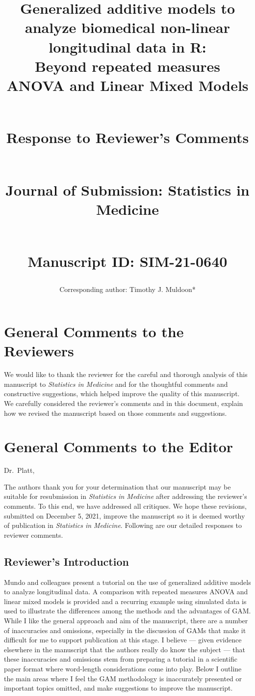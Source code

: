 \documentclass[
]{article}
\author{Corresponding author: Timothy J. Muldoon*}
\affil{Department of Biomedical Engineering, University of Arkansas, Fayetteville, AR, USA}
\affil{tmuldoon@uark.edu}
\title{\textbf{Generalized additive models to analyze biomedical non-linear longitudinal data in R:}\\
Beyond repeated measures ANOVA and Linear Mixed Models\\
\strut \\
Response to Reviewer's Comments\\
\strut \\
Journal of Submission: Statistics in Medicine\\
\strut \\
Manuscript ID: SIM-21-0640}
\author{}
\date{\vspace{-2.5em}}
\begin{document}
\maketitle

\hypertarget{general-comments-to-the-reviewers}{%
\section{General Comments to the Reviewers}\label{general-comments-to-the-reviewers}}

We would like to thank the reviewer for the careful and thorough analysis of this manuscript to \emph{Statistics in Medicine} and for the thoughtful comments and constructive suggestions, which helped improve the quality of this manuscript. We carefully considered the reviewer's comments and in this document, explain how we revised the manuscript based on those comments and suggestions.

\hypertarget{general-comments-to-the-editor}{%
\section{General Comments to the Editor}\label{general-comments-to-the-editor}}

Dr.~Platt,

The authors thank you for your determination that our manuscript may be suitable for resubmission in \emph{Statistics in Medicine} after addressing the reviewer's comments. To this end, we have addressed all critiques. We hope these revisions, submitted on December 5, 2021, improve the manuscript so it is deemed worthy of publication in \emph{Statistics in Medicine}. Following are our detailed responses to reviewer comments.

\hypertarget{reviewers-introduction}{%
\subsection{Reviewer's Introduction}\label{reviewers-introduction}}

Mundo and colleagues present a tutorial on the use of generalized additive models to analyze longitudinal data. A comparison with repeated measures ANOVA and linear mixed models is provided and a recurring example using simulated
data is used to illustrate the differences among the methods and the advantages of GAM. While I like the general approach and aim of the manuscript, there are a number of inaccuracies and omissions, especially in the discussion of GAMs that make it difficult for me to support publication at this stage. I believe --- given evidence elsewhere in the manuscript that the authors really do know the subject --- that these inaccuracies and omissions stem from preparing a tutorial in a scientific paper format where word-length considerations come into play. Below I outline the main areas where I feel the GAM methodology is inaccurately presented or important topics omitted, and make suggestions to improve the manuscript.
\end{document}
